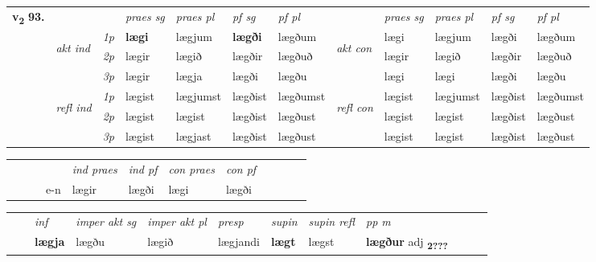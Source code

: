 \begin{tabular}{llllllllllll} \toprule
\multirow{4}{*}{{{\textbf{v{\textsubscript{2}}} \Large{\textbf{93.}}}}}  & &   &  \textit{praes sg}  & \textit{praes pl}  &\textit{ pf sg} & \textit{pf pl} &  &  \textit{praes sg}  & \textit{praes pl}  & \textit{pf sg} & \textit{pf pl } \\*
	\cmidrule{4-7} \cmidrule{9-12}
 & \multirow{3}{*}{\begin{turn}{90}\textit{akt ind}\end{turn}} & {\textit{1p}} & \textbf{lægi} & lægjum    & \textbf{lægði} & lægðum & \multirow{3}{*}{\begin{turn}{90}\textit{akt con}\end{turn}} &lægi & lægjum & lægði & lægðum\\*
& &  {\textit{2p}} &  lægir  & lægið   & lægðir & lægðuð & & lægir & lægið & lægðir & lægðuð \\*
& &  {\textit{3p}} & lægir & lægja   & lægði & lægðu & & lægi & lægi& lægði & lægðu  \\*
\cmidrule{4-7} \cmidrule{9-12}
 &\multirow{3}{*}{\begin{turn}{90}\textit{refl ind}\end{turn}} & {\textit{1p}} & lægist & lægjumst    & lægðist & lægðumst & \multirow{3}{*}{\begin{turn}{90}\textit{refl con}\end{turn}}  &lægist & lægjumst & lægðist & lægðumst\\*
 &&  {\textit{2p}} &  lægist  & lægist   & lægðist & lægðust & &lægist & lægist & lægðist & lægðust \\*
& &  {\textit{3p}} & lægist & lægjast   & lægðist & lægðust & & lægist & lægist& lægðist & lægðust  \\*
\cmidrule{4-7} \cmidrule{9-12}
\end{tabular}


\begin{tabular}{llllllllllll}
 & &  & &  \textit{ind praes} & \textit{ind pf} & \textit{con praes} & \textit{con pf} \\*
&  & & e-n & lægir & lægði & lægi & lægði \\*
\cmidrule{5-9}
\end{tabular}


\begin{tabular}{llllllllllll}
 & & \textit{inf} & \textit{imper akt sg} & \textit{imper akt pl}   & \textit{presp} & \textit{supin} & \textit{supin refl} & \textit{pp m}     \\*
  & & \textbf{lægja} & lægðu  & lægið   & lægjandi &  \textbf{lægt} & lægst & \textbf{lægður} adj \textbf{\textsubscript{2???}} \\*
\cmidrule{1-12}
\end{tabular}



